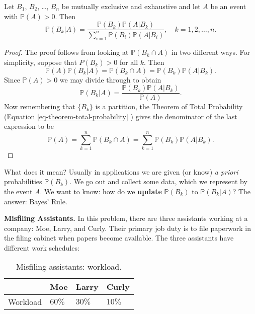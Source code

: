 \begin{thm}
Let \(B_{1}\), \(B_{2}\), \ldots{}, \(B_{n}\) be mutually exclusive and
exhaustive and let \(A\) be an event with \(\mathbb{P}(A)>0\). Then
\begin{equation}
\label{eq-bayes-rule}
\mathbb{P}(B_{k}|A)=\frac{\mathbb{P}(B_{k})\mathbb{P}(A|B_{k})}{\sum_{i=1}^{n}\mathbb{P}(B_{i})\mathbb{P}(A|B_{i})},\quad k=1,2,\ldots,n.
\end{equation}
\end{thm}

\begin{proof}
The proof follows from looking at \(\mathbb{P}(B_{k}\cap A)\) in two
different ways. For simplicity, suppose that \(P(B_{k})>0\) for all
\(k\). Then \[ \mathbb{P}(A)\mathbb{P}(B_{k}|A)=\mathbb{P}(B_{k}\cap
A)=\mathbb{P}(B_{k})\mathbb{P}(A|B_{k}).  \] Since \(\mathbb{P}(A)>0\)
we may divide through to obtain \[
\mathbb{P}(B_{k}|A)=\frac{\mathbb{P}(B_{k})\mathbb{P}(A|B_{k})}{\mathbb{P}(A)}.
\] Now remembering that \(\{ B_{k} \}\) is a partition, the Theorem of
Total Probability (Equation \eqref{eq-theorem-total-probability} )
gives the denominator of the last expression to be \[
\mathbb{P}(A)=\sum_{k=1}^{n}\mathbb{P}(B_{k}\cap
A)=\sum_{k=1}^{n}\mathbb{P}(B_{k})\mathbb{P}(A|B_{k}).  \]
\end{proof}

What does it mean? Usually in applications we are given (or know) \emph{a
priori} probabilities \(\mathbb{P}(B_{k})\). We go out and collect
some data, which we represent by the event \(A\). We want to know: how
do we \textbf{update} \(\mathbb{P}(B_{k})\) to \(\mathbb{P}(B_{k}|A)\)? The
answer: Bayes' Rule.

\label{exa-misfiling-assistants} \textbf{Misfiling Assistants.} In this problem,
there are three assistants working at a company: Moe, Larry, and
Curly. Their primary job duty is to file paperwork in the filing
cabinet when papers become available. The three assistants have
different work schedules:

\begin{table}[htb]
\caption[Misfiling assistants: workload]{Misfiling assistants: workload.}
\centering
\begin{tabular}{llll}
 & Moe & Larry & Curly\\
\hline
Workload & \(60\%\) & \(30\%\) & \(10\%\)\\
\end{tabular}
\end{table}

